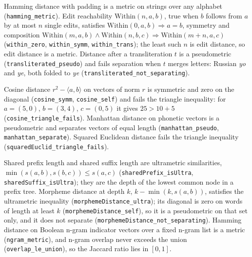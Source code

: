 \documentclass[11pt]{article}
\begin{document}
\begin{theorem}[Script]
\label{thm:script}
Hamming distance with padding is a metric on strings over any alphabet (\texttt{hamming\_metric}). Edit reachability $\mathrm{Within}(n,a,b)$, true when $b$ follows from $a$ by at most $n$ single edits, satisfies $\mathrm{Within}(0,a,b)\Rightarrow a=b$, symmetry and composition $\mathrm{Within}(m,a,b)\wedge\mathrm{Within}(n,b,c)\Rightarrow\mathrm{Within}(m+n,a,c)$ (\texttt{within\_zero}, \texttt{within\_symm}, \texttt{within\_trans}); the least such $n$ is edit distance, so edit distance is a metric. Distance after a transliteration $t$ is a pseudometric (\texttt{transliterated\_pseudo}) and fails separation when $t$ merges letters: Russian \emph{yo} and \emph{ye}, both folded to \emph{ye} (\texttt{transliterated\_not\_separating}).
\end{theorem}

\begin{theorem}[Vectors]
\label{thm:vectors}
Cosine distance $r^2-\langle a,b\rangle$ on vectors of norm $r$ is symmetric and zero on the diagonal (\texttt{cosine\_symm}, \texttt{cosine\_self}) and fails the triangle inequality: for $a=(5,0)$, $b=(3,4)$, $c=(0,5)$ it gives $25>10+5$ (\texttt{cosine\_triangle\_fails}). Manhattan distance on phonetic vectors is a pseudometric and separates vectors of equal length (\texttt{manhattan\_pseudo}, \texttt{manhattan\_separate}). Squared Euclidean distance fails the triangle inequality (\texttt{squaredEuclid\_triangle\_fails}).
\end{theorem}

\begin{theorem}[Subword]
\label{thm:subword}
Shared prefix length and shared suffix length are ultrametric similarities, $\min(s(a,b),s(b,c))\le s(a,c)$ (\texttt{sharedPrefix\_isUltra}, \texttt{sharedSuffix\_isUltra}); they are the depth of the lowest common node in a prefix tree. Morpheme distance at depth $k$, $k-\min(k,s(a,b))$, satisfies the ultrametric inequality (\texttt{morphemeDistance\_ultra}); its diagonal is zero on words of length at least $k$ (\texttt{morphemeDistance\_self}), so it is a pseudometric on that set only, and it does not separate (\texttt{morphemeDistance\_not\_separating}). Hamming distance on Boolean n-gram indicator vectors over a fixed n-gram list is a metric (\texttt{ngram\_metric}), and n-gram overlap never exceeds the union (\texttt{overlap\_le\_union}), so the Jaccard ratio lies in $[0,1]$.
\end{theorem}
\end{document}
